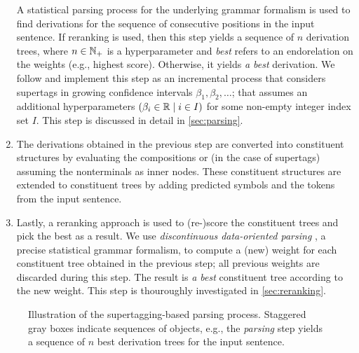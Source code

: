 \documentclass[../document.tex]{subfiles}
\begin{document}
\begin{enumerate}
            A statistical parsing process for the underlying grammar formalism is used to find derivations for the sequence of consecutive positions in the input sentence.
            If reranking is used, then this step yields a sequence of \(n\) derivation trees, where \(n \in \mathbb{N}_+\) is a hyperparameter and \emph{best} refers to an endorelation on the weights (e.g., highest score).
            Otherwise, it yields \emph{a best} derivation.
            We follow \citet{Auli12} and implement this step as an incremental process that considers supertags in growing confidence intervals \(\beta_1, \beta_2, \ldots\); that assumes an additional hyperparameters \((\beta_i \in \mathbb{R} \mid i \in I)\) for some non-empty integer index set \(I\).
            This step is discussed in detail in \cref{sec:parsing}.
        \item\label{parsing:item:3}
            The derivations obtained in the previous step are converted into constituent structures by evaluating the  compositions or (in the case of  supertags) assuming the nonterminals as inner nodes.
            These constituent structures are extended to constituent trees by adding predicted  symbols and the tokens from the input sentence.
        \item\label{parsing:item:4}
            Lastly, a reranking approach is used to (re-)score the constituent trees and pick the best as a result.
            We use \emph{discontinuous data-oriented parsing} \citep{CraSchBod16}, a precise statistical grammar formalism, to compute a (new) weight for each constituent tree obtained in the previous step; all previous weights are discarded during this step.
            The result is \emph{a best} constituent tree according to the new weight.
            This step is thouroughly investigated in \cref{sec:reranking}.
    \end{enumerate}

    \begin{figure}
        
        \caption{\label{fig:parsing:overview}
            Illustration of the supertagging-based parsing process.
            Staggered gray boxes indicate sequences of objects, e.g.\@, the \emph{parsing} step yields a sequence of \(n\) best derivation trees for the input sentence.
        }
    \end{figure}

    
    

    \ifSubfilesClassLoaded{%
        \printindex
    }{}
\end{document}
